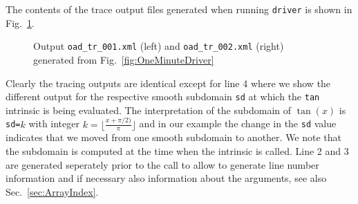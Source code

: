 \documentclass{article}
\newcommand{\refsec}[1]{{Sec.~\ref{#1}}}
\newcommand{\reffig}[1]{{Fig.~\ref{#1}}}
\begin{document}
The contents of the trace output files generated when running \lstinline{driver} 
is shown in \reffig{fig:OneMinuteXMLOutput}.
\begin{figure}
\begin{minipage}{.49\textwidth}

\end{minipage}
\hspace*{1ex}
\begin{minipage}{.46\textwidth}

\end{minipage}
\caption{Output \lstinline{oad_tr_001.xml} (left) 
and \lstinline{oad_tr_002.xml} (right) 
generated from \reffig{fig:OneMinuteDriver}}\label{fig:OneMinuteXMLOutput}
\end{figure}
Clearly the tracing outputs are identical except for line 4 where we show the 
different output for the respective smooth subdomain \lstinline{sd} at which the 
\lstinline{tan} intrinsic is being evaluated. The interpretation of the subdomain of $\tan(x)$ 
is \lstinline{sd=}$k$ with integer $k=\lfloor\frac{x+\pi/2)}{\pi}\rfloor$ and in our 
example the change in the \lstinline{sd} value  indicates that we moved from one smooth 
subdomain to another. 
We note that the subdomain is computed at the time when the intrinsic is called. Line 2 and 3 
are generated seperately prior to the call to allow to generate line number information 
and if necessary also information about the arguments, see also \refsec{sec:ArrayIndex}.

\end{document}
